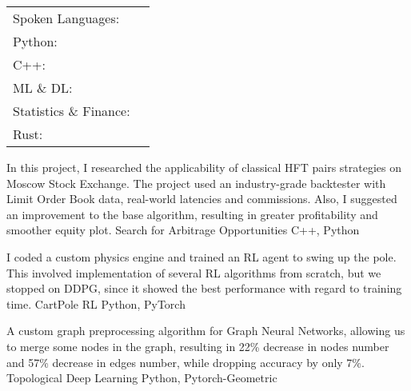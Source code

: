\documentclass[a4paper, 10pt]{awesome-cv}
\begin{document}
\vspace{-5mm}
\begin{cventries}
	\cventry
	{}
	{\def\arraystretch{1.15}{\begin{tabular}{ l l }
				Spoken Languages:      & {\skill{ Russian (native), English (C1 IELTS Academic)}}                                          \\
				Python:                & {\skill{ PyTorch, SKLearn, Pandas, Numpy, Seaborn, Matplotlib, multiprocessing, parsing}}         \\
				C++:                   & {\skill{ STL, QT, Algorithms and Data Structures}}                                                \\
				ML \& DL:              & {\skill{ Classical ML models, ANNs, basics of Reinforcement Learning, basics of Computer Vision}} \\
				Statistics \& Finance: & {\skill{ Black-Scholes, Time Series and Stochastic Processes, ARCH, GARCH, Econometrics}}         \\
				Rust:                  & {\skill{ STL, Tokio, egui}}                                                                       \\
			\end{tabular}}}
	{}
	{}
	{}
\end{cventries}

\vspace{-5mm}
\begin{cventries}
	\cventry
	{In this project, I researched the applicability of classical HFT pairs strategies on Moscow Stock Exchange. The project used an industry-grade backtester with Limit Order Book data, real-world latencies and commissions. Also, I suggested an improvement to the base algorithm, resulting in greater profitability and smoother equity plot.}
	{Search for Arbitrage Opportunities}
	{C++, Python}
	{}
	{}
	\vspace{-5mm}

	\cventry
	{I coded a custom physics engine and trained an RL agent to swing up the pole. This involved implementation of several RL algorithms from scratch, but we stopped on DDPG, since it showed the best performance with regard to training time.}
	{CartPole RL}
	{Python, PyTorch}
	{}
	{}
	\vspace{-5mm}

	\cventry
	{A custom graph preprocessing algorithm for Graph Neural Networks, allowing us to merge some nodes in the graph, resulting in 22\% decrease in nodes number and 57\% decrease in edges number, while dropping accuracy by only 7\%.}
	{Topological Deep Learning}
	{Python, Pytorch-Geometric}
	{}
	{}
	\vspace{-5mm}
\end{cventries}

\
\end{document}
